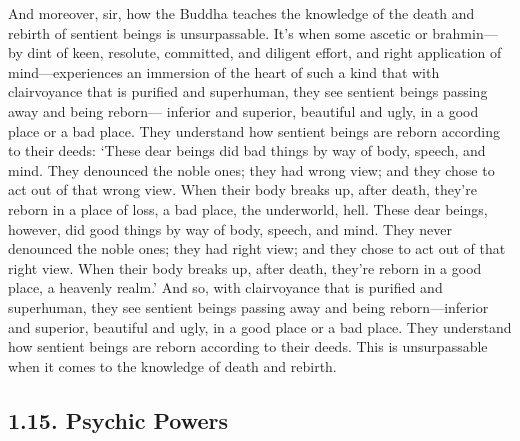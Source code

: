 \documentclass[12pt,openany]{book}%
\begin{document}
And moreover, sir, how the Buddha teaches the knowledge of the death and rebirth of sentient beings is unsurpassable. It’s when some ascetic or brahmin—by dint of keen, resolute, committed, and diligent effort, and right application of mind—experiences an immersion of the heart of such a kind that with clairvoyance that is purified and superhuman, they see sentient beings passing away and being reborn— inferior and superior, beautiful and ugly, in a good place or a bad place. They understand how sentient beings are reborn according to their deeds: ‘These dear beings did bad things by way of body, speech, and mind. They denounced the noble ones; they had wrong view; and they chose to act out of that wrong view. When their body breaks up, after death, they’re reborn in a place of loss, a bad place, the underworld, hell. These dear beings, however, did good things by way of body, speech, and mind. They never denounced the noble ones; they had right view; and they chose to act out of that right view. When their body breaks up, after death, they’re reborn in a good place, a heavenly realm.’ And so, with clairvoyance that is purified and superhuman, they see sentient beings passing away and being reborn—inferior and superior, beautiful and ugly, in a good place or a bad place. They understand how sentient beings are reborn according to their deeds. This is unsurpassable when it comes to the knowledge of death and rebirth. 

\subsection*{1.15. Psychic Powers }
\end{document}
